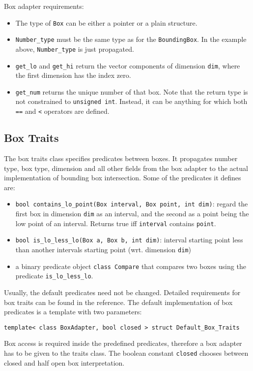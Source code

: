 Box adapter requirements:
\begin{itemize}
 \item The type of \texttt{Box} can be either a pointer or a plain structure.
 \item \texttt{Number\_type} must be the same type as for the \texttt{BoundingBox}. In the example above, \texttt{Number\_type} is just propagated.
 \item \texttt{get\_lo} and \texttt{get\_hi} return the vector components of dimension \texttt{dim}, where the first  dimension has the index zero.
 \item \texttt{get\_num} returns the unique number of that box. Note that the return type is not constrained to \texttt{unsigned int}. Instead, it can be anything for which both \texttt{==} and \texttt{<} operators are defined.
\end{itemize}

\subsection*{Box Traits}
The box traits class specifies predicates between boxes. It propagates number type, box type, dimension and all other fields from the box adapter to the actual implementation of bounding box intersection. Some of the predicates it defines are:

\begin{itemize}
 \item \texttt{bool contains\_lo\_point(Box interval, Box point, int dim)}: regard the first box in dimension \texttt{dim} as an interval, and the second as a point being the low point of an interval. Returns true iff \texttt{interval} contains \texttt{point}.
 \item \texttt{bool is\_lo\_less\_lo(Box a, Box b, int dim)}: interval starting point less than another intervals starting point (wrt. dimension \texttt{dim})
 \item a binary predicate object \texttt{class Compare} that compares two boxes using the predicate \texttt{is\_lo\_less\_lo}.
\end{itemize}

Usually, the default predicates need not be changed. Detailed requirements for box traits can be found in the reference. The default implementation of box predicates is a template with two parameters:

\texttt{template< class BoxAdapter, bool closed > struct Default\_Box\_Traits}

Box access is required inside the predefined predicates, therefore a box adapter has to be given to the traits class. The boolean constant \texttt{closed} chooses between closed and half open box interpretation. 


